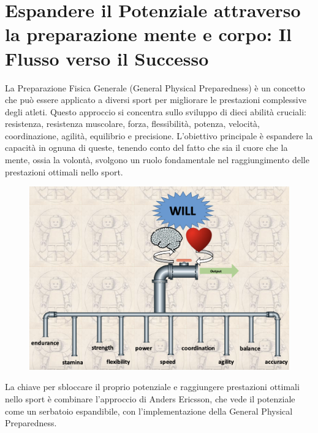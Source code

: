 \documentclass[12pt,oneside,a4paper]{article}
\begin{document}
\section{Espandere il Potenziale attraverso la preparazione mente e corpo: Il Flusso verso il Successo} \label{sec:famem}
La Preparazione Fisica Generale (General Physical Preparedness) è un concetto che può essere applicato a diversi sport per migliorare le prestazioni complessive degli atleti. Questo approccio si concentra sullo sviluppo di dieci abilità cruciali: resistenza, resistenza muscolare, forza, flessibilità, potenza, velocità, coordinazione, agilità, equilibrio e precisione. L'obiettivo principale è espandere la capacità in ognuna di queste, tenendo conto del fatto che sia il cuore che la mente, ossia la volontà, svolgono un ruolo fondamentale nel raggiungimento delle prestazioni ottimali nello sport. 
\begin{figure}[h]
    \centering
    \includegraphics[width=.8\textwidth]{tubi.png}
    \label{fig:my_label}
\end{figure}

La chiave per sbloccare il proprio potenziale e raggiungere prestazioni ottimali nello sport è combinare l'approccio di Anders Ericsson, che vede il potenziale come un serbatoio espandibile, con l'implementazione della General Physical Preparedness. 
\end{document}
